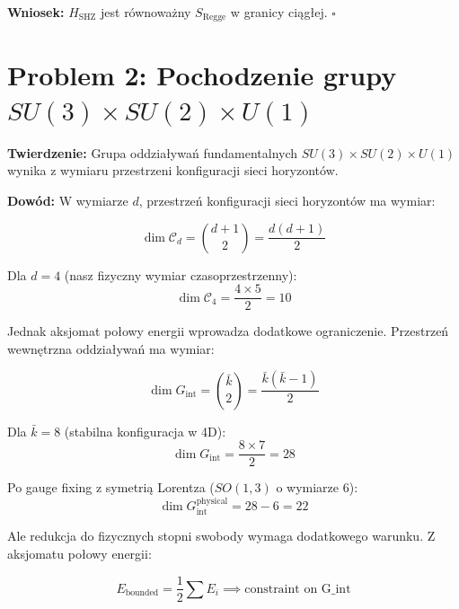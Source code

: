 \documentclass[11pt,a4paper]{article}
\begin{document}
\bigskip

\textbf{Wniosek:} $H_{\text{SHZ}}$ jest równoważny $S_{\text{Regge}}$ w granicy ciągłej. $\square$

\bigskip

\section{Problem 2: Pochodzenie grupy $SU(3) \times SU(2) \times U(1)$}

\bigskip

\textbf{Twierdzenie:} Grupa oddziaływań fundamentalnych $SU(3) \times SU(2) \times U(1)$ wynika z wymiaru przestrzeni konfiguracji sieci horyzontów.

\bigskip

\textbf{Dowód:} W wymiarze $d$, przestrzeń konfiguracji sieci horyzontów ma wymiar:

\begin{equation}
\dim \mathcal{C}_d = \binom{d+1}{2} = \frac{d(d+1)}{2}
\end{equation}

Dla $d=4$ (nasz fizyczny wymiar czasoprzestrzenny):
\begin{equation}
\dim \mathcal{C}_4 = \frac{4 \times 5}{2} = 10
\end{equation}

Jednak aksjomat połowy energii wprowadza dodatkowe ograniczenie. Przestrzeń wewnętrzna oddziaływań ma wymiar:

\begin{equation}
\dim G_{\text{int}} = \binom{\bar{k}}{2} = \frac{\bar{k}(\bar{k}-1)}{2}
\end{equation}

Dla $\bar{k} = 8$ (stabilna konfiguracja w 4D):
\begin{equation}
\dim G_{\text{int}} = \frac{8 \times 7}{2} = 28
\end{equation}

Po gauge fixing z symetrią Lorentza ($SO(1,3)$ o wymiarze 6):
\begin{equation}
\dim G_{\text{int}}^{\text{physical}} = 28 - 6 = 22
\end{equation}

Ale redukcja do fizycznych stopni swobody wymaga dodatkowego warunku. Z aksjomatu połowy energii:

\begin{equation}
E_{\text{bounded}} = \frac{1}{2} \sum E_i \implies \text{constraint on G\_int}
\end{equation}
\end{document}
